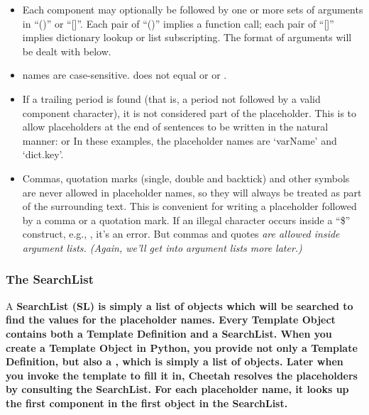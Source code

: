\begin{enumerate}
\begin{itemize}

\item Each component may optionally be followed by one or more sets of 
     arguments in ``()'' or ``[]''.  Each pair of ``()'' implies a function
     call; each pair of ``[]'' implies dictionary lookup or list
     subscripting.  The format of arguments will be dealt with below.

\item names are case-sensitive.  does not equal 
     or  or .     
     
\item If a trailing period is found (that is, a period not followed by a valid
     component character), it is not considered part of the placeholder.  This
     is to allow placeholders at the end of sentences to be written in the 
     natural manner:  or
       In these examples, the 
     placeholder names are `varName' and `dict.key'.

\item Commas, quotation marks (single, double and backtick) and other symbols
     are never allowed in placeholder names, so they will always be treated
     as part of the surrounding text.  This is convenient for writing a 
     placeholder followed by a comma or a quotation mark.  If an illegal
     character occurs inside a ``\${}'' construct, e.g., ,
     it's an error.  But commas and quotes \em{are} allowed inside argument
     lists.  (Again, we'll get into argument lists more later.)

\end{itemize}
     

\subsubsection{The SearchList}

A \bf{SearchList (SL)} is simply a list of objects which will be searched to
find the values for the placeholder names.  Every Template Object
contains both a Template Definition and a SearchList.  
When you create a Template Object in Python, you provide not only a
Template Definition, but also a , which is simply a list of
objects.  Later when you invoke the template to fill it in, Cheetah resolves
the placeholders by consulting the SearchList.  For each placeholder name, it
looks up the first component in the first object in the SearchList.


\end{enumerate}
